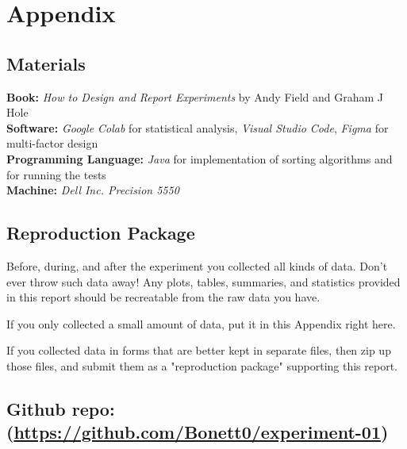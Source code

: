 \documentclass{article}
\begin{document}
\section{Appendix}
\subsection{Materials}
\textbf{Book: } \textit{How to Design and Report Experiments} by Andy Field and Graham J Hole\\
\textbf{Software: } \textit{Google Colab} for statistical analysis, \textit{Visual Studio Code}, \textit{Figma} for multi-factor design\\
\textbf{Programming Language: } \textit{Java} for implementation of sorting algorithms and for running the tests\\
\textbf{Machine: } \textit {Dell Inc. Precision 5550 }
\subsection{Reproduction Package}
Before, during, and after the experiment you collected all kinds of data. Don't ever throw such data away! Any plots, tables, summaries, and statistics provided in this report should be recreatable from the raw data you have.

If you only collected a small amount of data, put it in this Appendix right here.

If you collected data in forms that are better kept in separate files, then zip up those files, and submit them as a "reproduction package" supporting this report.

\subsection*{{Github repo: (\url{https://github.com/Bonett0/experiment-01})}}
\end{document}
